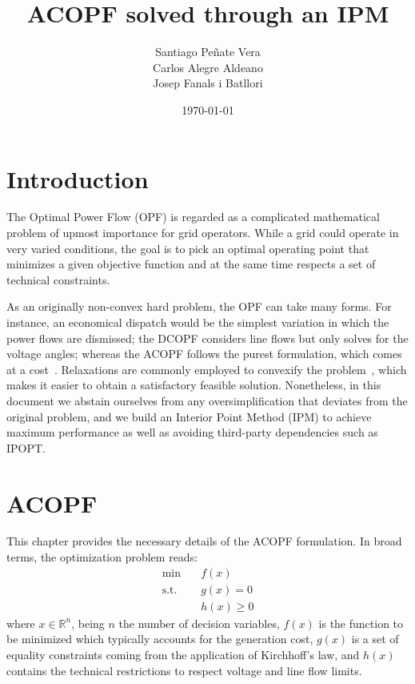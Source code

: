 \documentclass{article}
\title{ACOPF solved through an IPM}
\author{Santiago Peñate Vera \\ Carlos Alegre Aldeano \\ Josep Fanals i Batllori}
\date{\today}
\begin{document}
\maketitle

\section{Introduction}

The Optimal Power Flow (OPF) is regarded as a complicated mathematical problem of upmost importance for grid operators. While a grid could operate in very varied conditions, the goal is to pick an optimal operating point that minimizes a given objective function and at the same time respects a set of technical constraints.

As an originally non-convex hard problem, the OPF can take many forms. For instance, an economical dispatch would be the simplest variation in which the power flows are dismissed; the DCOPF considers line flows but only solves for the voltage angles; whereas the ACOPF follows the purest formulation, which comes at a cost~\cite{chatzivasileiadis2018optimization}. Relaxations are commonly employed to convexify the problem~\cite{ergun2019optimal}, which makes it easier to obtain a satisfactory feasible solution. Nonetheless, in this document we abstain ourselves from any oversimplification that deviates from the original problem, and we build an Interior Point Method (IPM) to achieve maximum performance as well as avoiding third-party dependencies such as IPOPT.

\section{ACOPF}
This chapter provides the necessary details of the ACOPF formulation. In broad terms, the optimization problem reads: 
\begin{equation}
\begin{split}
    \text{min} \quad & f(x) \\
    \text{s.t.} \quad & g(x) = 0 \\
     & h(x) \geq 0
\end{split}
\end{equation}
where $x \in \mathbb{R}^n$, being $n$ the number of decision variables, $f(x)$ is the function to be minimized which typically accounts for the generation cost, $g(x)$ is a set of equality constraints coming from the application of Kirchhoff's law, and $h(x)$ contains the technical restrictions to respect voltage and line flow limits.
\end{document}
